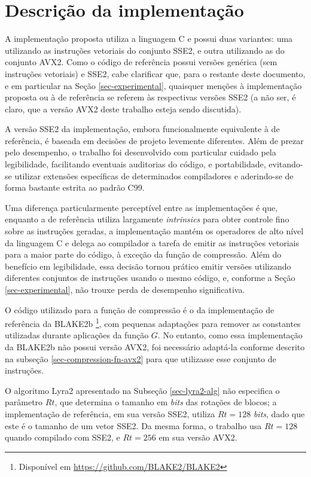\documentclass{article}
\begin{document}
\section{Descrição da implementação}

A implementação proposta utiliza a linguagem C e possui duas variantes: uma
utilizando as instruções vetoriais do conjunto SSE2, e outra utilizando
as do conjunto AVX2. Como o código de referência possui versões genérica
(sem instruções vetoriais) e SSE2, cabe clarificar que, para o restante
deste documento, e em particular na Seção \ref{sec-experimental},
quaisquer menções à implementação proposta ou à de referência se referem às
respectivas versões SSE2 (a não ser, é claro, que a versão AVX2 deste trabalho
esteja sendo discutida).

A versão SSE2 da implementação, embora funcionalmente equivalente
à de referência, é baseada em decisões de projeto levemente diferentes.
Além de prezar pelo desempenho, o trabalho foi desenvolvido com
particular cuidado pela legibilidade, facilitando eventuais auditorias
do código, e portabilidade, evitando-se utilizar extensões específicas
de determinados compiladores e aderindo-se de forma bastante estrita ao
padrão C99.

Uma diferença particularmente perceptível entre as implementações é que,
enquanto a de referência utiliza largamente \emph{intrinsics} para obter
controle fino sobre as instruções geradas, a implementação mantém os
operadores de alto nível da linguagem C e delega ao compilador a tarefa
de emitir as instruções vetoriais para a maior parte do código, à
exceção da função de compressão. Além do benefício em legibilidade, essa
decisão tornou prático emitir versões utilizando diferentes conjuntos de
instruções usando o mesmo código, e, conforme a Seção
\ref{sec-experimental}, não trouxe perda de desempenho significativa.

O código utilizado para a função de compressão é o da implementação de
referência da BLAKE2b \footnote{Disponível em
  \url{https://github.com/BLAKE2/BLAKE2}}, com pequenas adaptações para
remover as constantes utilizadas durante aplicações da função $G$. No
entanto, como essa implementação da BLAKE2b não possui versão AVX2, foi
necessário adaptá-la conforme descrito na subseção
\ref{sec-compression-fn-avx2} para que utilizasse esse conjunto de
instruções.

O algoritmo Lyra2 apresentado na Subseção \ref{sec-lyra2-alg} não
especifica o parâmetro $Rt$, que determina o tamanho em \emph{bits} das
rotações de blocos; a implementação de referência, em sua versão SSE2,
utiliza $Rt = 128$ \emph{bits}, dado que este é o tamanho de um vetor SSE2.
Da mesma forma, o trabalho usa $Rt = 128$ quando compilado com
SSE2, e $Rt = 256$ em sua versão AVX2.
\end{document}
